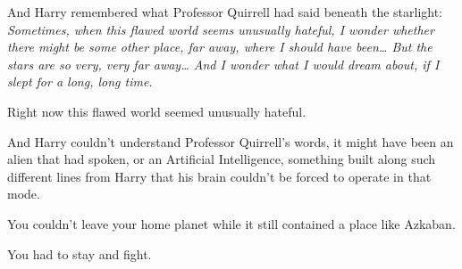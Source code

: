 And Harry remembered what Professor Quirrell had said beneath the starlight:
\emph{Sometimes, when this flawed world seems unusually hateful, I wonder
whether there might be some other place, far away, where I should have
been{\ldots} But the stars are so very, very far away{\ldots} And I wonder what
I would dream about, if I slept for a long, long time.}

Right now this flawed world seemed unusually hateful.

And Harry couldn't understand Professor Quirrell's words, it might have been an
alien that had spoken, or an Artificial Intelligence, something built along
such different lines from Harry that his brain couldn't be forced to operate in
that mode.

You couldn't leave your home planet while it still contained a place like
Azkaban.

You had to stay and fight.
